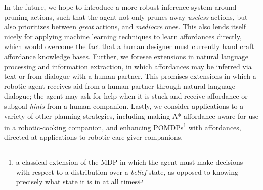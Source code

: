 \documentclass[]{article}
\begin{document}
In the future, we hope to introduce a more robust inference system around pruning actions, such that
the agent not only prunes away {\it useless} actions, but also prioritizes between
{\it great} actions, and {\it mediocre} ones. This also lends itself nicely for applying
machine learning techniques to learn affordances directly, which would 
overcome the fact that a human designer must currently hand craft affordance knowledge bases.
Further, we foresee extensions in natural language processing and information
extraction, in which affordances may be inferred via text or from dialogue with a human partner.
This promises extensions in which a robotic agent receives aid from a human partner through natural language
dialogue; the agent may ask for help when it is stuck and
receive affordance or subgoal {\it hints} from a human companion. Lastly, we consider applications to a variety of other planning
strategies, including making A* affordance aware for use in a robotic-cooking companion, and enhancing POMDPs\footnote{a classical extension of the MDP in which the agent must make decisions with respect to a distribution over a {\it belief} state,
as opposed to knowing precisely what state it is in at all times} with affordances, directed at applications to robotic care-giver companions.


  
\end{document}
